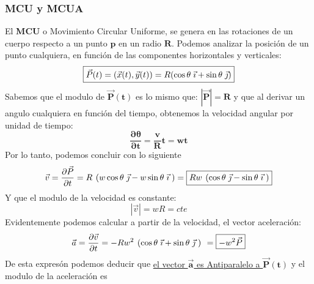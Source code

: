 \subsubsection{MCU y MCUA}
\begin{wrapfigure}{1}{6cm}
        \hspace{0.2cm}
        
        \par
\end{wrapfigure}
\noindent El \textbf{MCU} o Movimiento Circular Uniforme, se genera en las rotaciones de un cuerpo respecto a un punto \(\bm{p}\) en un radio \(\bm{R}\).
Podemos analizar la posición de un punto cualquiera, en función de las componentes horizontales y verticales:
\[
        \boxed{\vec{P}(t)=(\vec{x}(t),\vec{y}(t))=R(\cos{\theta}\hspace{1mm}\vec{\imath} + \sin{\theta}\hspace{1mm}\vec{\jmath})}
\]
Sabemos que el modulo de \(\bm{\vec{P}(t)}\) es lo mismo que: \(\bm{\left | \vec{P} \right | = R}\) y que al derivar un angulo cualquiera en función del tiempo, obtenemos la velocidad angular por unidad de tiempo:
\[
        \boxed{\bm{\frac{\partial \theta}{\partial t} = \frac{v}{R}t = wt}}
\]
Por lo tanto, podemos concluir con lo siguiente
\[
        \vec{v} =\frac{\partial \vec{P}}{\partial t} =R \hspace{1.35mm} (w\cos{\theta}\hspace{1mm}\vec{\jmath} - w\sin{\theta}\hspace{1mm}\vec{\imath}\hspace{1mm})  =\boxed{Rw \hspace{1.35mm} (\cos{\theta}\hspace{1mm}\vec{\jmath} - \sin{\theta}\hspace{1mm}\vec{\imath}\hspace{1mm})}
\]
Y que el modulo de la velocidad es constante:
\[
        \left | \vec{v} \right | = wR = cte
\]
Evidentemente podemos calcular a partir de la velocidad, el vector aceleración:
\[
        \vec{a} =\frac{\partial \vec{v}}{\partial t} = -Rw^2 \hspace{1.35mm}(\cos{\theta}\hspace{1mm}\vec{\imath} + \sin{\theta}\hspace{1mm}\vec{\jmath}\hspace{1mm}) \hspace{1.35mm}= \boxed{-w^{2}\vec{P}}
\]
De esta expresón podemos deducir que \underline{el vector \(\bm{\vec{a}}\) es Antiparalelo a \(\bm{\vec{P}(t)}\)} y el modulo de la aceleración es 
